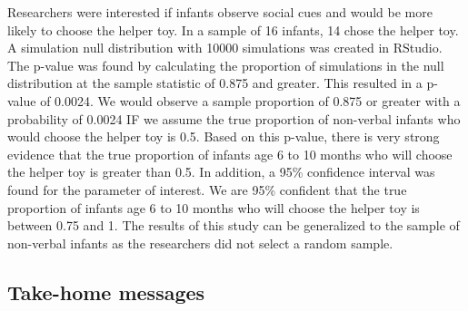 \documentclass[
]{report}
\begin{document}
Researchers were interested if infants observe social cues and would be more likely to choose the helper toy. In a sample of 16 infants, 14 chose the helper toy. A simulation null distribution with 10000 simulations was created in RStudio. The p-value was found by calculating the proportion of simulations in the null distribution at the sample statistic of 0.875 and greater. This resulted in a p-value of 0.0024. We would observe a sample proportion of 0.875 or greater with a probability of 0.0024 IF we assume the true proportion of non-verbal infants who would choose the helper toy is 0.5. Based on this p-value, there is very strong evidence that the true proportion of infants age 6 to 10 months who will choose the helper toy is greater than 0.5. In addition, a 95\% confidence interval was found for the parameter of interest. We are 95\% confident that the true proportion of infants age 6 to 10 months who will choose the helper toy is between 0.75 and 1. The results of this study can be generalized to the sample of non-verbal infants as the researchers did not select a random sample.


\subsection{Take-home messages}\label{take-home-messages-5}
\end{document}

